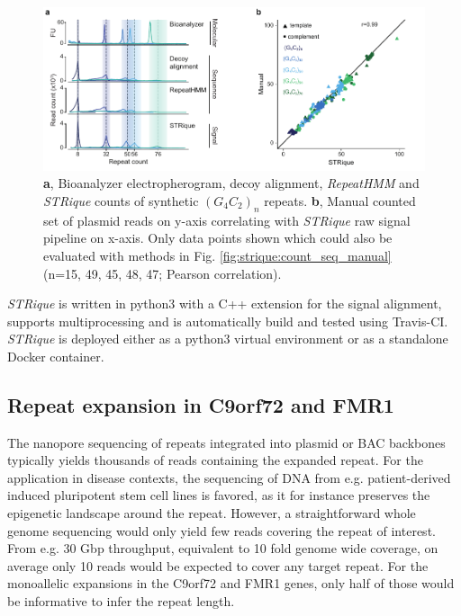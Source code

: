 \begin{figure}[h]
	\centering
	\includegraphics[width=1.0\textwidth]{figures/strique/count_signal_corr.pdf}
	\captionsetup{format=plain}
	\caption[Molecular, sequence and signal based STR evaluation]{\textbf{a}, Bioanalyzer electropherogram, decoy alignment, \textit{RepeatHMM} and \textit{STRique} counts of synthetic $ (G_{4}C_{2})_{n} $ repeats. \textbf{b}, Manual counted set of plasmid reads on y-axis correlating with \textit{STRique} raw signal pipeline on x-axis. Only data points shown which could also be evaluated with methods in Fig. \ref{fig:strique:count_seq_manual} (n=15, 49, 45, 48, 47; Pearson correlation).}
	\label{fig:strique:count_signal_corr}
\end{figure}

\textit{STRique} is written in python3 with a C++ extension for the signal alignment, supports multiprocessing and is automatically build and tested using Travis-CI. \textit{STRique} is deployed either as a python3 virtual environment or as a standalone Docker container.




\subsection{Repeat expansion in C9orf72 and FMR1}
\label{subsec:strique:c9orf72}

The nanopore sequencing of repeats integrated into plasmid or BAC backbones typically yields thousands of reads containing the expanded repeat. For the application in disease contexts, the sequencing of DNA from e.g. patient-derived induced pluripotent stem cell lines is favored, as it for instance preserves the epigenetic landscape around the repeat. However, a straightforward whole genome sequencing would only yield few reads covering the repeat of interest. From e.g. 30 Gbp throughput, equivalent to 10 fold genome wide coverage, on average only 10 reads would be expected to cover any target repeat. For the monoallelic expansions in the C9orf72 and FMR1 genes, only half of those would be informative to infer the repeat length.

